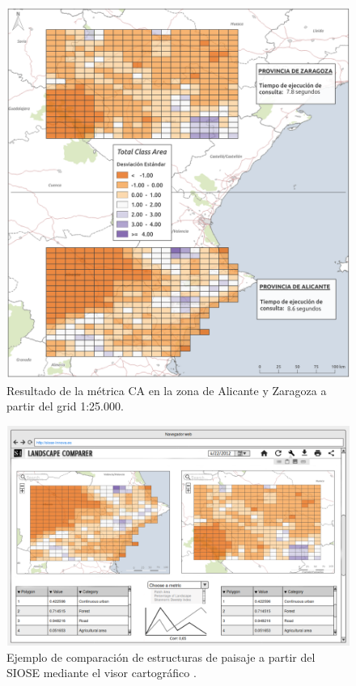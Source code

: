 \begin{figure}
\begin{center}
\includegraphics[width=\textwidth]{ResultadosyDiscusion/Figs/Results/c_25.png}
\caption{Resultado de la métrica CA en la zona de Alicante y Zaragoza a partir del grid 1:25.000. \label{fig:c_25}}
\end{center}
\end{figure}


\begin{figure}
\begin{center}
\includegraphics[width=\textwidth]{ResultadosyDiscusion/Figs/visor-final.png}
\caption{Ejemplo de comparación de estructuras de paisaje a partir del SIOSE mediante el visor cartográfico . \label{fig:visor-final}}
\end{center}
\end{figure}